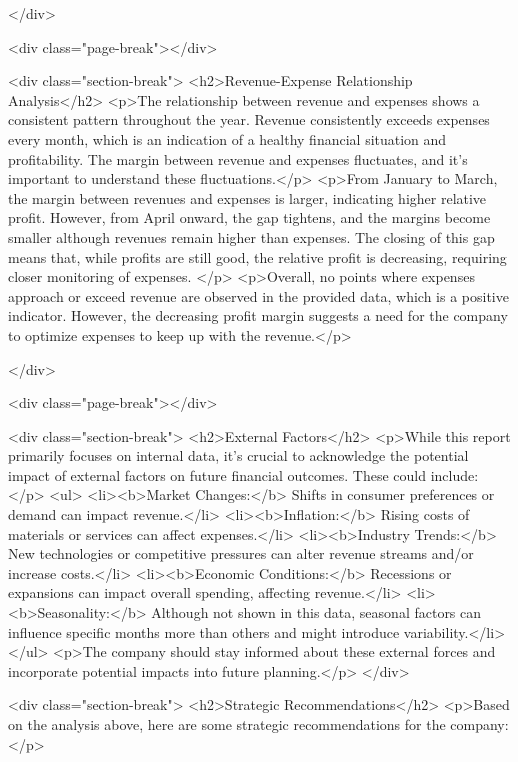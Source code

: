 {    </div>

    <div class="page-break"></div>

    <div class="section-break">
        <h2>Revenue-Expense Relationship Analysis</h2>
        <p>The relationship between revenue and expenses shows a consistent pattern throughout the year. Revenue consistently exceeds expenses every month, which is an indication of a healthy financial situation and profitability. The margin between revenue and expenses fluctuates, and it's important to understand these fluctuations.</p>
        <p>From January to March, the margin between revenues and expenses is larger, indicating higher relative profit. However, from April onward, the gap tightens, and the margins become smaller although revenues remain higher than expenses. The closing of this gap means that, while profits are still good, the relative profit is decreasing, requiring closer monitoring of expenses.
         </p>
       <p>Overall, no points where expenses approach or exceed revenue are observed in the provided data, which is a positive indicator. However, the decreasing profit margin suggests a need for the company to optimize expenses to keep up with the revenue.</p>
       
    </div>

    <div class="page-break"></div>

    <div class="section-break">
        <h2>External Factors</h2>
        <p>While this report primarily focuses on internal data, it’s crucial to acknowledge the potential impact of external factors on future financial outcomes. These could include:</p>
        <ul>
          <li><b>Market Changes:</b> Shifts in consumer preferences or demand can impact revenue.</li>
          <li><b>Inflation:</b> Rising costs of materials or services can affect expenses.</li>
            <li><b>Industry Trends:</b>  New technologies or competitive pressures can alter revenue streams and/or increase costs.</li>
            <li><b>Economic Conditions:</b>  Recessions or expansions can impact overall spending, affecting revenue.</li>
            <li><b>Seasonality:</b> Although not shown in this data, seasonal factors can influence specific months more than others and might introduce variability.</li>
        </ul>
        <p>The company should stay informed about these external forces and incorporate potential impacts into future planning.</p>
    </div>

    <div class="section-break">
      <h2>Strategic Recommendations</h2>
    <p>Based on the analysis above, here are some strategic recommendations for the company:</p>

}
